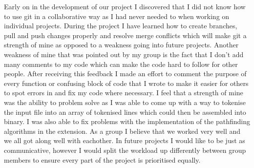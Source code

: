 \documentclass[11pt]{article}
\begin{document}
Early on in the development of our project I discovered that I did not know how to use git in a collaborative way as I had never needed to 
when working on individual projects. During the project I have learned how to create branches, pull and push changes properly and resolve merge conflicts which will 
make git a strength of mine as opposed to a weakness going into future projects.
\newline
Another weakness of mine that was pointed out by my group is the fact that I don't add many comments to my code which can make the code hard to follow for other people.
After receiving this feedback I made an effort to comment the purpose of every function or confusing block of code that I wrote to make it easier for others to spot errors
in and fix my code where necessary.
\newline
I feel that a strength of mine was the ability to problem solve as I was able to come up with a way to tokenise the input file into an array of tokenised lines which could then
be assembled into binary. I was also able to fix problems with the implementation of the pathfinding algorithms in the extension.   
\newline
As a group I believe that we worked very well and we all got along well with eachother. In future projects I would like to be just as communicative, however I would split the
workload up differently between group members to ensure every part of the project is prioritised equally.
\end{document}

